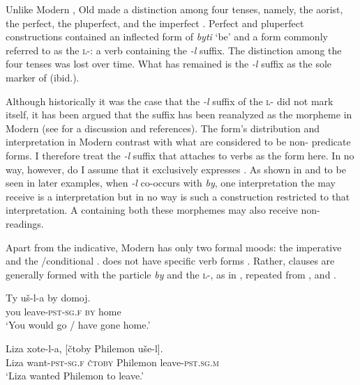 \documentclass[output=paper,modfonts,newtxmath,hidelinks,]{langscibook}
\begin{document}
\noindent Unlike Modern , Old  made a distinction among four  tenses, namely, the aorist, the perfect, the pluperfect, and the imperfect \citep[38]{Mezhevich2006}. Perfect and pluperfect constructions contained an inflected form of \textit{byti} ‘be’ and a form commonly referred to as the \textsc{l}-: a verb containing the \textit{-l} suffix. The distinction among the four  tenses was lost over time. What has remained is the \textit{-l} suffix as the sole marker of  (ibid.).

Although historically it was the case that the \textit{-l} suffix of the \textsc{l}- did not mark  itself, it has been argued that the suffix has been reanalyzed as the  morpheme in Modern  (see \citealt{Mezhevich2006} for a discussion and references). The form’s distribution and interpretation in Modern  contrast with what are considered to be non- predicate forms. I therefore treat the \textit{-l} suffix that attaches to verbs as the  form here. In no way, however, do I assume that it exclusively expresses . As shown in  and to be seen in later examples, when \textit{{}-}\textit{l\-} co-occurs with \textit{by}, one interpretation the  may receive is a  interpretation but in no way is such a construction restricted to that interpretation. A  containing both these morphemes may also receive non- readings.

Apart from the indicative, Modern  has only two formal moods: the imperative and the /conditional \citep[157]{Cubberley2002}.  does not have specific  verb forms \citep[118]{Mezhevich2006}. Rather,  clauses are generally formed with the particle \textit{by} and the \textsc{l}-, as in , repeated from , and .

\ea \label{10:ex5}
\gll Ty uš-l-a by domoj.\\
     you leave\textsc{-pst-sg.f} \textsc{by} home\\
\glt `You would go / have gone home.' \hfill \citep[152]{Mezhevich2006}
\z

\ea \label{10:ex6}
\gll Liza xote-l-a, [čtoby Philemon uše-l].\\
     Liza want\textsc{-pst-sg.f} { }\textsc{čtoby} Philemon leave-\textsc{pst.sg.m}\\
\glt `Liza wanted Philemon to leave.' \hfill \citep[148]{Mezhevich2006}
\z
\end{document}
